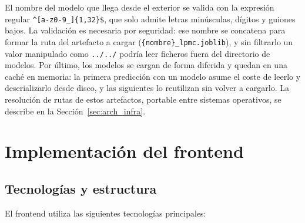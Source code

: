 El nombre del modelo que llega desde el exterior se valida con la expresión regular \texttt{\textasciicircum[a-z0-9\_]\{1,32\}\$}, que solo admite letras minúsculas, dígitos y guiones bajos. La validación es necesaria por seguridad: ese nombre se concatena para formar la ruta del artefacto a cargar (\texttt{\{nombre\}\_lpmc.joblib}), y sin filtrarlo un valor manipulado como \texttt{../../} podría leer ficheros fuera del directorio de modelos. Por último, los modelos se cargan de forma diferida y quedan en una caché en memoria: la primera predicción con un modelo asume el coste de leerlo y deserializarlo desde disco, y las siguientes lo reutilizan sin volver a cargarlo. La resolución de rutas de estos artefactos, portable entre sistemas operativos, se describe en la Sección~\ref{sec:arch_infra}.


\section{Implementación del frontend}
\label{sec:impl_frontend}

\subsection{Tecnologías y estructura}
\label{subsec:impl_frontend_tech}

El frontend utiliza las siguientes tecnologías principales:

